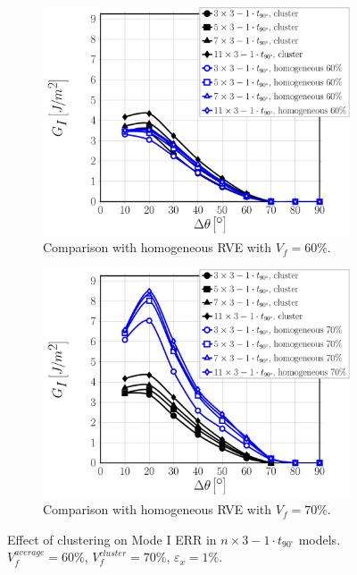 \documentclass[review]{elsarticle}
\begin{document}
\begin{figure}[!h]
\centering
    \begin{subfigure}[b]{0.475\textwidth}
        \includegraphics[width=\textwidth]{nx1-1t90-vf60-GI.pdf}
        \caption{Comparison with homogeneous RVE with $V_{f}=60\%$.}\label{subfig:cluster1t90nx3ModeI60}
    \end{subfigure}\quad
    \begin{subfigure}[b]{0.475\textwidth}
        \includegraphics[width=\textwidth]{nx1-1t90-vf70-GI.pdf}
        \caption{Comparison with homogeneous RVE with $V_{f}=70\%$.}\label{subfig:cluster1t90nx3ModeI70}
    \end{subfigure}

\caption{Effect of clustering on Mode I ERR in $n\times 3-1\cdot t_{90^{\circ}}$ models. $V^{average}_{f}=60\%$, $V^{cluster}_{f}=70\%$, $\varepsilon_{x}=1\%$.}\label{fig:cluster1t90nx3ModeI}
\end{figure}
\end{document}
